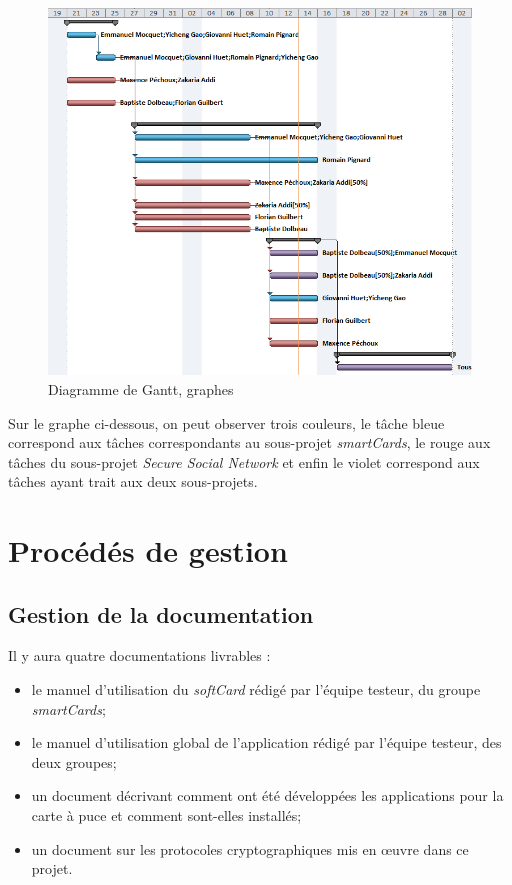 \documentclass[a4paper,11pt,french]{article}
\begin{document}
\begin{center}
\begin{figure}[!h]
\includegraphics[scale=0.70]{diagramme.PNG}
\caption{Diagramme de Gantt, graphes}
\end{figure}
\end{center}
Sur le graphe ci-dessous, on peut observer trois couleurs, le tâche bleue correspond
aux tâches correspondants au sous-projet \emph{smartCards}, le rouge aux
tâches du sous-projet \emph{Secure Social Network} et enfin le violet
correspond aux tâches ayant trait aux deux sous-projets.
\clearpage
\section{Procédés de gestion}

\subsection{Gestion de la documentation}
Il y aura quatre documentations livrables : 
\begin{itemize}
 \item le manuel d'utilisation du \emph{softCard} rédigé par l'équipe testeur,
 du groupe \emph{smartCards};
 \item le manuel d'utilisation global de l'application rédigé par l'équipe 
 testeur, des deux groupes;
 \item un document décrivant comment ont été développées les applications pour
 la carte à puce et comment sont-elles installés;
 \item un document sur les protocoles cryptographiques mis en \oe{}uvre
 dans ce projet.
\end{itemize}
\end{document}
